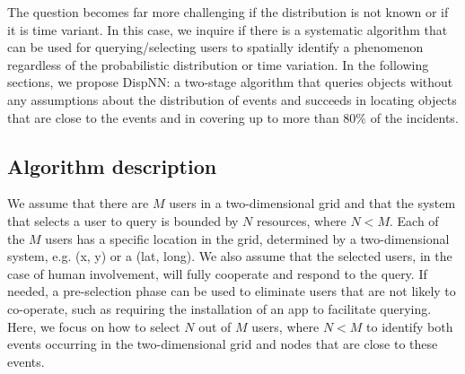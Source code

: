 \documentclass{acm_proc_article-sp}
\begin{document}
The question becomes far more challenging if the distribution is not known or if it is time variant. In this case, we inquire if there is a systematic algorithm that can be used for querying/selecting users to spatially identify a phenomenon regardless of the probabilistic distribution or time variation. In the following sections, we propose DispNN: a two-stage algorithm that queries objects without any assumptions about the distribution of events and succeeds in locating objects that are close to the events and in covering up to more than $80\%$ of the incidents. \par

\subsection{Algorithm description}
We assume that there are $M$ users in a two-dimensional grid and that the system that selects a user to query is bounded by $N$ resources, where $N < M$.  Each of the $M$ users has a specific location in the grid, determined by a two-dimensional system, e.g. (x, y) or a (lat, long). We also assume that the selected users, in the case of human involvement, will fully cooperate and respond to the query. If needed, a pre-selection phase can be used to eliminate users that are not likely to co-operate, such as requiring the installation of an app to facilitate querying. Here, we focus on how to select $N$ out of $M$ users, where $N < M$ to identify both events occurring in the two-dimensional grid and nodes that are close to these events.\par
\end{document}
